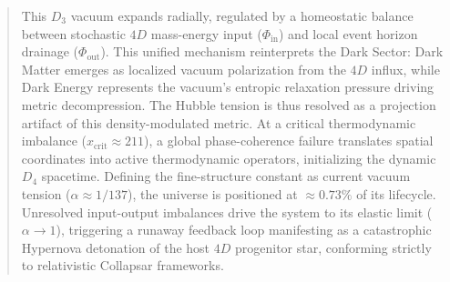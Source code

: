 \documentclass[11pt,a4paper]{article}
\theoremstyle{plain}
\theoremstyle{definition}
\theoremstyle{remark}
\begin{document}
\begin{abstract}
This $D_3$ vacuum expands radially, regulated by a homeostatic balance between stochastic $4D$ mass-energy input ($\Phi_{\text{in}}$) and local event horizon drainage ($\Phi_{\text{out}}$). This unified mechanism reinterprets the Dark Sector: Dark Matter emerges as localized vacuum polarization from the $4D$ influx, while Dark Energy represents the vacuum's entropic relaxation pressure driving metric decompression. The Hubble tension is thus resolved as a projection artifact of this density-modulated metric. At a critical thermodynamic imbalance ($x_{\text{crit}} \approx 211$), a global phase-coherence failure translates spatial coordinates into active thermodynamic operators, initializing the dynamic $D_4$ spacetime. Defining the fine-structure constant as current vacuum tension ($\alpha \approx 1/137$), the universe is positioned at $\approx 0.73\%$ of its lifecycle. Unresolved input-output imbalances drive the system to its elastic limit ($\alpha \rightarrow 1$), triggering a runaway feedback loop manifesting as a catastrophic Hypernova detonation of the host $4D$ progenitor star, conforming strictly to relativistic Collapsar frameworks.
\end{abstract}

\newpage
\tableofcontents
\newpage
\end{document}
